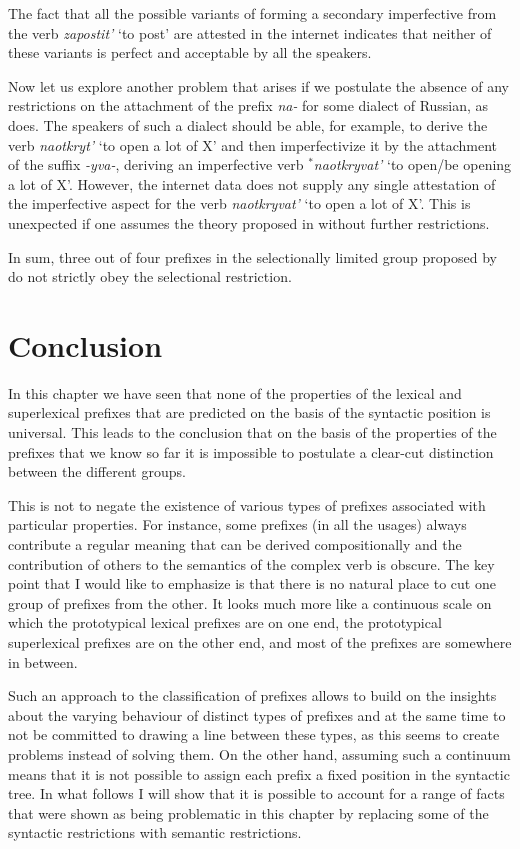 The fact that all the possible variants of forming a secondary imperfective from the verb \textit{zapostit'} `to post' are attested in the internet indicates that neither of these variants is perfect and acceptable by all the speakers.

Now let us explore another problem that arises if we postulate the absence of any restrictions on the attachment of the prefix \textit{na-} for some dialect of Russian, as \citet{Tatevosov:13a} does. The speakers of such a dialect should be able, for example, to derive the verb \textit{naotkryt'}\textsuperscript{\PF} `to open a lot of X' and then imperfectivize it by the attachment of the suffix \textit{-yva-}, deriving an imperfective verb $^*$\textit{naotkryvat'}\textsuperscript{\IPF} `to open/be opening a lot of X'. However, the internet data does not supply any single attestation of the imperfective aspect for the verb \textit{naotkryvat'} `to open a lot of X'. This is unexpected if one assumes the theory proposed in \citet{Tatevosov:13a} without further restrictions.

In sum, three out of four prefixes in the selectionally limited group proposed by \citet{Tatevosov:09} do not strictly obey the selectional restriction. 

\section{Conclusion}\label{section:new:conclusion}
In this chapter we have seen that none of the properties of the lexical and superlexical prefixes that are predicted on the basis of the syntactic position is universal. This leads to the conclusion that on the basis of the properties of the prefixes that we know so far it is impossible to postulate a clear-cut distinction between the different groups. 

This is not to negate the existence of various types of prefixes associated with particular properties. For instance, some prefixes (in all the usages) always contribute a regular meaning that can be derived compositionally and the contribution of others to the semantics of the complex verb is obscure. The key point that I would like to emphasize is that there is no natural place to cut one group of prefixes from the other. It looks much more like a continuous scale on which the prototypical lexical prefixes are on one end, the prototypical superlexical prefixes are on the other end, and most of the prefixes are somewhere in between. 

Such an approach to the classification of prefixes allows to build on the insights about the varying behaviour of distinct types of prefixes and at the same time to not be committed to drawing a line between these types, as this seems to create problems instead of solving them. On the other hand, assuming such a continuum means that it is not possible to assign each prefix a fixed position in the syntactic tree. In what follows I will show that it is possible to account for a range of facts that were shown as being problematic in this chapter by replacing some of the syntactic restrictions with semantic restrictions.
